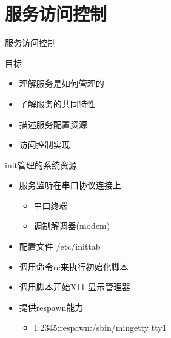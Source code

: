 

\section{服务访问控制}

\begin{frame}{服务访问控制}

目标
\begin{itemize}
\item 理解服务是如何管理的
\item 了解服务的共同特性
\item 描述服务配置资源
\item 访问控制实现
\end{itemize}

\end{frame} 
\begin{frame}{init管理的系统资源}
\begin{itemize}
\item 服务监听在串口协议连接上

\begin{itemize}
\item 串口终端
\item 调制解调器(modem)
\end{itemize}
\item 配置文件 /etc/inittab
\item 调用命令rc来执行初始化脚本
\item 调用脚本开始X11 显示管理器
\item 提供respawn能力

\begin{itemize}
\item 1:2345:respawn:/sbin/mingetty tty1
\end{itemize}
\end{itemize}

\end{frame} 
